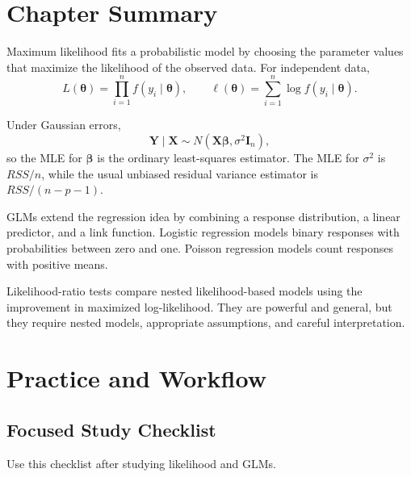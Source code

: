 \section{Chapter Summary}

Maximum likelihood fits a probabilistic model by choosing the parameter values that maximize the likelihood of the observed data.  For independent data,
\begin{equation}
  L(\boldsymbol{\theta})=\prod_{i=1}^n f(y_i\mid\boldsymbol{\theta}),
  \qquad
  \ell(\boldsymbol{\theta})=\sum_{i=1}^n\log f(y_i\mid\boldsymbol{\theta}).
\end{equation}

Under Gaussian errors,
\begin{equation}
  \mathbf{Y}\mid\mathbf{X}\sim N(\mathbf{X}\boldsymbol{\beta},\sigma^2\mathbf{I}_n),
\end{equation}
so the MLE for \(\boldsymbol{\beta}\) is the ordinary least-squares estimator.  The MLE for \(\sigma^2\) is \(RSS/n\), while the usual unbiased residual variance estimator is \(RSS/(n-p-1)\).

GLMs extend the regression idea by combining a response distribution, a linear predictor, and a link function.  Logistic regression models binary responses with probabilities between zero and one.  Poisson regression models count responses with positive means.

Likelihood-ratio tests compare nested likelihood-based models using the improvement in maximized log-likelihood.  They are powerful and general, but they require nested models, appropriate assumptions, and careful interpretation.

\section{Practice and Workflow}

\subsection*{Focused Study Checklist}

Use this checklist after studying likelihood and GLMs.

